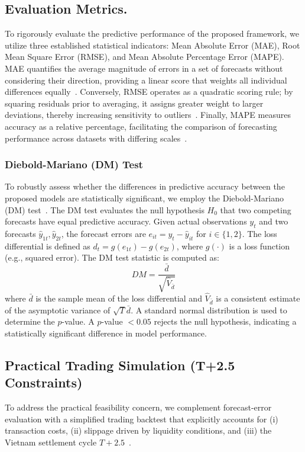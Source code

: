 \documentclass{ieeeaccess}
\begin{document}
\subsection{Evaluation Metrics.} 
To rigorously evaluate the predictive performance of the proposed framework, we utilize three established statistical indicators: Mean Absolute Error (MAE), Root Mean Square Error (RMSE), and Mean Absolute Percentage Error (MAPE). MAE quantifies the average magnitude of errors in a set of forecasts without considering their direction, providing a linear score that weights all individual differences equally~\cite{willmott2005advantages}. Conversely, RMSE operates as a quadratic scoring rule; by squaring residuals prior to averaging, it assigns greater weight to larger deviations, thereby increasing sensitivity to outliers~\cite{chai2014root}. Finally, MAPE measures accuracy as a relative percentage, facilitating the comparison of forecasting performance across datasets with differing scales~\cite{hyndman2006another}.

\subsubsection{Diebold-Mariano (DM) Test}
To robustly assess whether the differences in predictive accuracy between the proposed models are statistically significant, we employ the Diebold-Mariano (DM) test~\cite{diebold1995comparing}. The DM test evaluates the null hypothesis $H_0$ that two competing forecasts have equal predictive accuracy. Given actual observations $y_t$ and two forecasts $\hat{y}_{1t}, \hat{y}_{2t}$, the forecast errors are $e_{it} = y_t - \hat{y}_{it}$ for $i \in \{1,2\}$. The loss differential is defined as $d_t = g(e_{1t}) - g(e_{2t})$, where $g(\cdot)$ is a loss function (e.g., squared error). The DM test statistic is computed as:
\begin{equation}
DM = \frac{\bar{d}}{\sqrt{\hat{V}_{\bar{d}}}}
\end{equation}
where $\bar{d}$ is the sample mean of the loss differential and $\hat{V}_{\bar{d}}$ is a consistent estimate of the asymptotic variance of $\sqrt{T}\bar{d}$. A standard normal distribution is used to determine the $p$-value. A $p$-value $< 0.05$ rejects the null hypothesis, indicating a statistically significant difference in model performance.

\subsection{Practical Trading Simulation (T+2.5 Constraints)}
To address the practical feasibility concern, we complement forecast-error evaluation with a simplified trading backtest that explicitly accounts for (i) transaction costs, (ii) slippage driven by liquidity conditions, and (iii) the Vietnam settlement cycle $T+2.5$~\cite{TinNhanhChungkhoan2025}.
\end{document}
